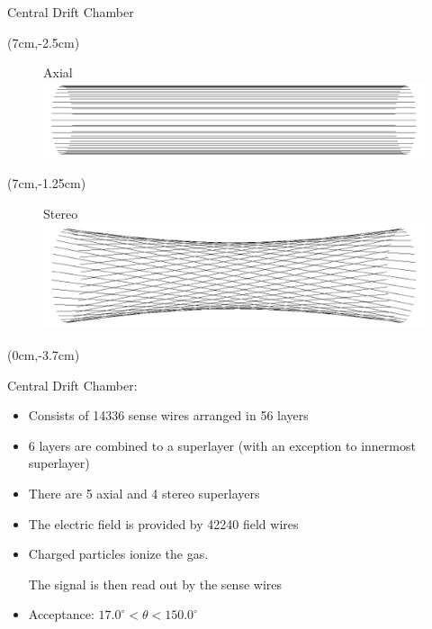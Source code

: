 \documentclass[8pt]{beamer}
\begin{document}
\begin{frame}{Central Drift Chamber}

	\begin{textblock*}{4cm}(7cm,-2.5cm)
		\begin{figure}
			Axial
			\includegraphics[width=\textwidth]{VBilder/axial}
		\end{figure}
	\end{textblock*}

	\begin{textblock*}{4cm}(7cm,-1.25cm)
		
		\begin{figure}
			Stereo
			\includegraphics[width=\textwidth]{VBilder/stereo}
		\end{figure}
	\end{textblock*}




	\begin{textblock*}{10cm}(0cm,-3.7cm)
	
		Central Drift Chamber:
		\begin{itemize}
			\item Consists of 14336 sense wires arranged in 56 layers
			\item 6 layers are combined to a superlayer (with an exception to innermost superlayer)
			\item There are 5 axial and 4 stereo superlayers
			\item The electric field is provided by 42240 field wires
			\item Charged particles ionize the gas. 
			
			The signal is then read out by the sense wires  
			\item Acceptance: $17.0^{\circ} < \theta < 150.0^{\circ}$ 
		\end{itemize}


\end{textblock*}
\end{frame}
\end{document}

